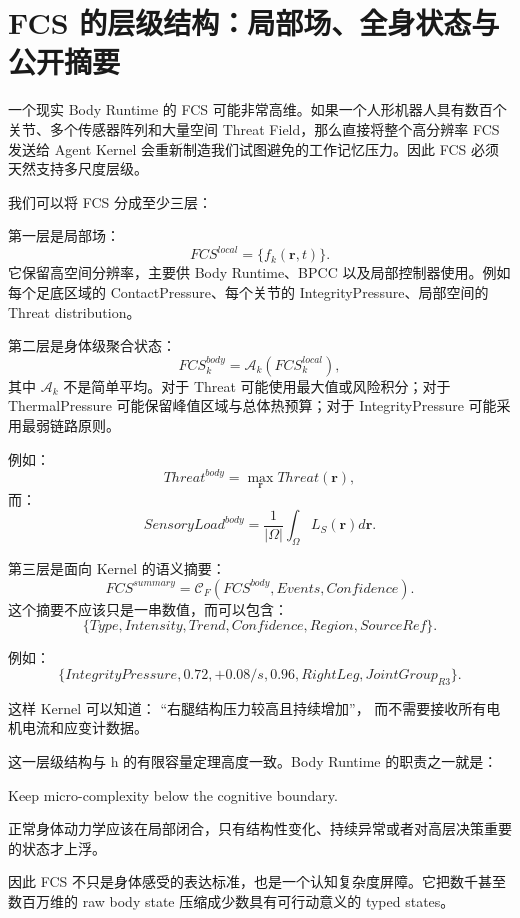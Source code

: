 \section{FCS 的层级结构：局部场、全身状态与公开摘要}

一个现实 Body Runtime 的 FCS 可能非常高维。如果一个人形机器人具有数百个关节、多个传感器阵列和大量空间 Threat Field，那么直接将整个高分辨率 FCS 发送给 Agent Kernel 会重新制造我们试图避免的工作记忆压力。因此 FCS 必须天然支持多尺度层级。

我们可以将 FCS 分成至少三层：
\begin{statementbox}
\centering
{}
\end{statementbox}

第一层是局部场：
\[
FCS^{local}
=
\{f_k(\mathbf r,t)\}.
\]
它保留高空间分辨率，主要供 Body Runtime、BPCC 以及局部控制器使用。例如每个足底区域的 ContactPressure、每个关节的 IntegrityPressure、局部空间的 Threat distribution。

第二层是身体级聚合状态：
\[
FCS^{body}_k
=
\mathcal A_k
\left(
FCS^{local}_k
\right),
\]
其中 $\mathcal A_k$ 不是简单平均。对于 Threat 可能使用最大值或风险积分；对于 ThermalPressure 可能保留峰值区域与总体热预算；对于 IntegrityPressure 可能采用最弱链路原则。

例如：
\[
Threat^{body}
=
\max_{\mathbf r}
Threat(\mathbf r),
\]
而：
\[
SensoryLoad^{body}
=
\frac{1}{|\Omega|}
\int_{\Omega}
L_S(\mathbf r)d\mathbf r.
\]

第三层是面向 Kernel 的语义摘要：
\[
FCS^{summary}
=
\mathcal C_F
(
FCS^{body},
Events,
Confidence
).
\]
这个摘要不应该只是一串数值，而可以包含：
\[
\{
Type,
Intensity,
Trend,
Confidence,
Region,
SourceRef
\}.
\]

例如：
\[
\{
IntegrityPressure,
0.72,
+0.08/s,
0.96,
RightLeg,
JointGroup_{R3}
\}.
\]

这样 Kernel 可以知道：
“右腿结构压力较高且持续增加”，
而不需要接收所有电机电流和应变计数据。

这一层级结构与 h 的有限容量定理高度一致。Body Runtime 的职责之一就是：
\begin{statementbox}
Keep micro-complexity below the cognitive boundary.
\end{statementbox}
正常身体动力学应该在局部闭合，只有结构性变化、持续异常或者对高层决策重要的状态才上浮。

因此 FCS 不只是身体感受的表达标准，也是一个认知复杂度屏障。它把数千甚至数百万维的 raw body state 压缩成少数具有可行动意义的 typed states。

